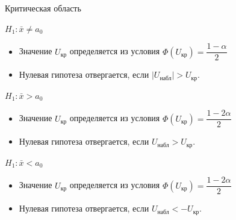 \documentclass[unicode,11pt,notheorems,xcolor=table]{beamer}
\begin{document}
\begin{frame}{Критическая область}{}
 
    $H_1\colon \bar{x} \neq  a_0$
    \begin{itemize}
            \item Значение $U_\text{кр}$ определяется из условия \hfill 
            $\Phi(U_\text{кр}) = \dfrac{1-\alpha}{2}$
            \item Нулевая гипотеза отвергается, если \hfill $|U_\text{набл}| > U_\text{кр}$.
    \end{itemize}

    \vfill
    $H_1\colon \bar{x} >  a_0$  
    \begin{itemize}
        \item Значение $U_\text{кр}$ определяется из условия \hfill 
        $\Phi(U_\text{кр}) = \dfrac{1-2\alpha}{2}$
        \item Нулевая гипотеза отвергается, если \hfill $U_\text{набл} > U_\text{кр}$.
    \end{itemize}        
    \vfill

    $H_1\colon \bar{x} <  a_0$    
    \begin{itemize}
        \item Значение $U_\text{кр}$ определяется из условия \hfill 
        $\Phi(U_\text{кр}) = \dfrac{1-2\alpha}{2}$
        \item Нулевая гипотеза отвергается, если \hfill $U_\text{набл} < -U_\text{кр}$.
    \end{itemize}        
\end{frame}


\end{document}
